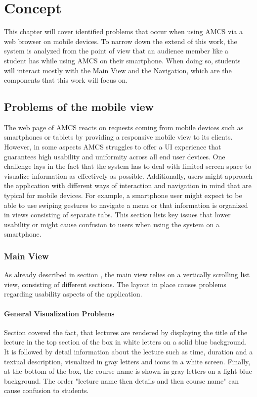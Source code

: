\chapter{Concept}
This chapter will cover identified problems that occur when using AMCS via a web browser on mobile
devices. To narrow down the extend of this work, the system is analyzed from the point of view that an audience member like a student has while using AMCS on their smartphone. When doing so, students will interact mostly with the Main View and the Navigation, which are the components that this work will focus on.

\section{Problems of the mobile view}

The web page of AMCS reacts on requests coming from mobile devices such as smartphones or tablets by providing a responsive mobile view to its clients. However, in some aspects AMCS struggles to offer a UI experience that guarantees high usability and uniformity across all end user devices.
One challenge lays in the fact that the system has to deal with limited screen space to visualize information as effectively as possible. Additionally, users might approach the application with different ways of interaction and navigation in mind that are typical for mobile devices. For example, a smartphone user might expect to be able to use swiping gestures to navigate a menu or that information is organized in views consisting of separate tabs. This section lists key issues that lower usability or might cause confusion to users when using the system on a smartphone.

\subsection{Main View}
As already described in section \todosct, the main view relies on a vertically scrolling list view, consisting of different sections. The layout in place causes problems regarding usability aspects of the application.

\subsubsection{General Visualization Problems}
\label{section:con:problems:mainview:generalvis}
Section \todosct covered the fact, that lectures are rendered by displaying the title of the lecture in the top section of the box in white letters on a solid blue background. It is followed by detail information about the lecture such as time, duration and a textual description, visualized in gray letters and icons in a white screen. Finally, at the bottom of the box, the course name is shown in gray letters on a light blue background. The order "lecture name then details and then course name" can cause confusion to students.

